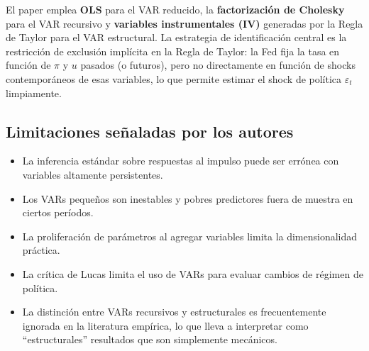 \documentclass[12pt]{article}
\begin{document}
El paper emplea \textbf{OLS} para el VAR reducido, la \textbf{factorizaci\'on de Cholesky} para el VAR recursivo y \textbf{variables instrumentales (IV)} generadas por la Regla de Taylor para el VAR estructural. La estrategia de identificaci\'on central es la restricci\'on de exclusi\'on impl\'icita en la Regla de Taylor: la Fed fija la tasa en funci\'on de $\pi$ y $u$ pasados (o futuros), pero no directamente en funci\'on de shocks contempor\'aneos de esas variables, lo que permite estimar el shock de pol\'itica $\varepsilon_t$ limpiamente.

\subsection{Limitaciones se\~naladas por los autores}

\begin{itemize}
  \item La inferencia est\'andar sobre respuestas al impulso puede ser err\'onea con variables altamente persistentes.
  \item Los VARs peque\~nos son inestables y pobres predictores fuera de muestra en ciertos per\'iodos.
  \item La proliferaci\'on de par\'ametros al agregar variables limita la dimensionalidad pr\'actica.
  \item La cr\'itica de Lucas limita el uso de VARs para evaluar cambios de r\'egimen de pol\'itica.
  \item La distinci\'on entre VARs recursivos y estructurales es frecuentemente ignorada en la literatura emp\'irica, lo que lleva a interpretar como ``estructurales'' resultados que son simplemente mec\'anicos.
\end{itemize}
\end{document}
